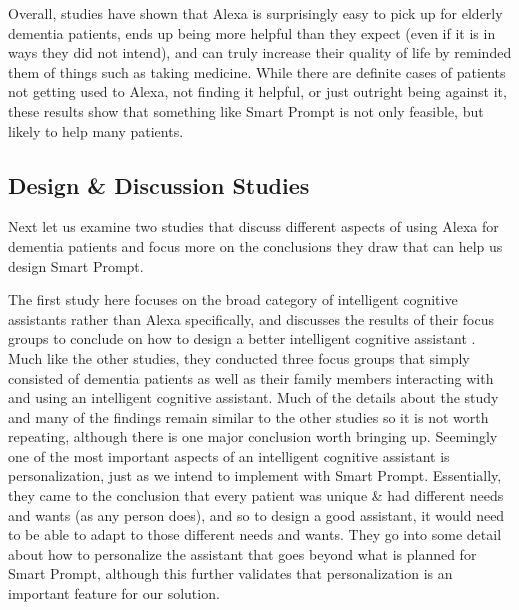 \documentclass[11pt, oneside]{article}
\begin{document}
Overall, studies have shown that Alexa is surprisingly easy to pick up for elderly dementia patients, ends up being more helpful than they expect (even if it is in ways they did not intend), and can truly increase their quality of life by reminded them of things such as taking medicine. 
While there are definite cases of patients not getting used to Alexa, not finding it helpful, or just outright being against it, these results show that something like Smart Prompt is not only feasible, but likely to help many patients. 

\subsection{Design \& Discussion Studies}

Next let us examine two studies that discuss different aspects of using Alexa for dementia patients and focus more on the conclusions they draw that can help us design Smart Prompt. 

The first study here focuses on the broad category of intelligent cognitive assistants rather than Alexa specifically, and discusses the results of their focus groups to conclude on how to design a better intelligent cognitive assistant \cite{b7}.
Much like the other studies, they conducted three focus groups that simply consisted of dementia patients as well as their family members interacting with and using an intelligent cognitive assistant. 
Much of the details about the study and many of the findings remain similar to the other studies so it is not worth repeating, although there is one major conclusion worth bringing up. 
Seemingly one of the most important aspects of an intelligent cognitive assistant is personalization, just as we intend to implement with Smart Prompt. 
Essentially, they came to the conclusion that every patient was unique \& had different needs and wants (as any person does), and so to design a good assistant, it would need to be able to adapt to those different needs and wants. 
They go into some detail about how to personalize the assistant that goes beyond what is planned for Smart Prompt, although this further validates that personalization is an important feature for our solution. 
\end{document}
